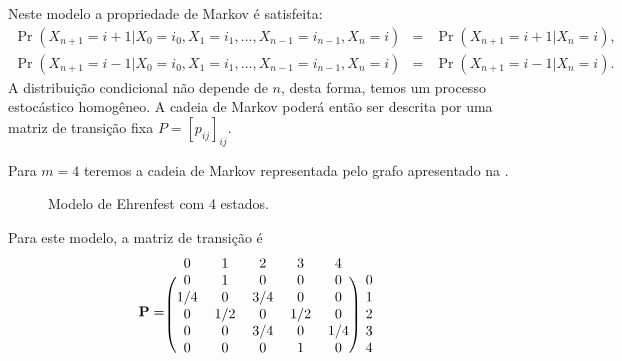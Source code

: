 \begin{example}
Neste modelo a propriedade de Markov é satisfeita:
\begin{subequations}
\begin{align}
\Pr(X_{n+1} = i+1 | X_0 = i_0, X_1 = i_1, \ldots, X_{n-1} = i_{n-1}, X_n = i) &=& \Pr(X_{n+1} = i+1 | X_n = i) , \\
\Pr(X_{n+1} = i-1 | X_0 = i_0, X_1 = i_1, \ldots, X_{n-1} = i_{n-1}, X_n = i) &=& \Pr(X_{n+1} = i-1 | X_n = i) . 
\end{align}
\end{subequations}
A distribuição condicional não depende de $n$, desta forma, temos um processo estocástico homogêneo.
A cadeia de Markov poderá então ser descrita por uma matriz de transição fixa $P = [p_{ij}]_{ij}$.

Para $m = 4$ teremos a cadeia de Markov representada pelo grafo apresentado na .
\begin{figure}%
  \caption{Modelo de Ehrenfest com 4 estados.}
  \label{fig:ehrenfestm4}
\end{figure}

Para este modelo, a matriz de transição é
\begin{equation}
\mathbf{P} =
\begin{blockarray}{cccccc}
0 & 1 & 2 & 3 & 4 \\
\begin{block}{(ccccc)c}
  0   & 1   & 0   & 0   & 0   & 0 \\
  1/4 & 0   & 3/4 & 0   & 0   & 1 \\
  0   & 1/2 & 0   & 1/2 & 0   & 2 \\
  0   & 0   & 3/4 & 0   & 1/4 & 3 \\
  0   & 0   & 0   & 1   & 0   & 4 \\
\end{block}
\end{blockarray}
\end{equation}


\end{example}
